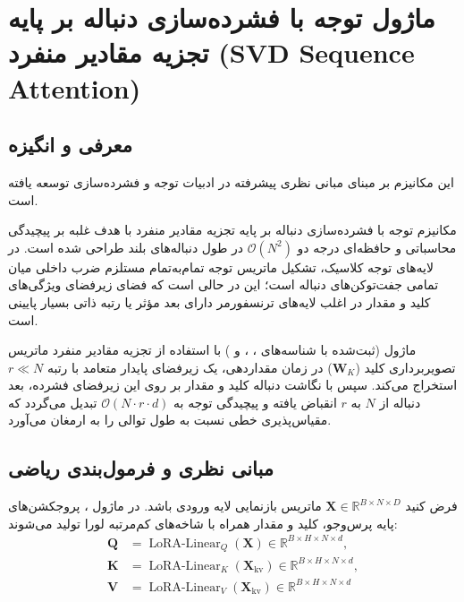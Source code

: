 \section{ماژول توجه با فشرده‌سازی دنباله بر پایه تجزیه مقادیر منفرد (SVD Sequence Attention)}
\label{sec:module_svd_attention}

\subsection{معرفی و انگیزه}
این مکانیزم بر مبنای مبانی نظری پیشرفته در ادبیات توجه و فشرده‌سازی \cite{eckart1936approximation} توسعه یافته است.

مکانیزم توجه با فشرده‌سازی دنباله بر پایه تجزیه مقادیر منفرد  با هدف غلبه بر پیچیدگی محاسباتی و حافظه‌ای درجه دو $\mathcal{O}(N^2)$ در طول دنباله‌های بلند طراحی شده است. در لایه‌های توجه کلاسیک، تشکیل ماتریس توجه تمام‌به‌تمام مستلزم ضرب داخلی میان تمامی جفت‌توکن‌های دنباله است؛ این در حالی است که فضای زیرفضای ویژگی‌های کلید و مقدار در اغلب لایه‌های ترنسفورمر دارای بعد مؤثر یا رتبه ذاتی بسیار پایینی است.

ماژول  (ثبت‌شده با شناسه‌های ، ،  و ) با استفاده از تجزیه مقادیر منفرد ماتریس تصویربرداری کلید ($\mathbf{W}_K$) در زمان مقداردهی، یک زیرفضای پایدار متعامد با رتبه $r \ll N$ استخراج می‌کند. سپس با نگاشت دنباله کلید و مقدار بر روی این زیرفضای فشرده، بعد دنباله از $N$ به $r$ انقباض یافته و پیچیدگی توجه به $\mathcal{O}(N \cdot r \cdot d)$ تبدیل می‌گردد که مقیاس‌پذیری خطی نسبت به طول توالی را به ارمغان می‌آورد.

\subsection{مبانی نظری و فرمول‌بندی ریاضی}
فرض کنید $\mathbf{X} \in \mathbb{R}^{B \times N \times D}$ ماتریس بازنمایی لایه ورودی باشد. در ماژول ، پروجکشن‌های پایه پرس‌وجو، کلید و مقدار همراه با شاخه‌های کم‌مرتبه لورا تولید می‌شوند:
\begin{align}
\mathbf{Q} &= \operatorname{LoRA-Linear}_Q(\mathbf{X}) \in \mathbb{R}^{B \times H \times N \times d}, \\
\mathbf{K} &= \operatorname{LoRA-Linear}_K(\mathbf{X}_{\text{kv}}) \in \mathbb{R}^{B \times H \times N \times d}, \\
\mathbf{V} &= \operatorname{LoRA-Linear}_V(\mathbf{X}_{\text{kv}}) \in \mathbb{R}^{B \times H \times N \times d}
\end{align}

